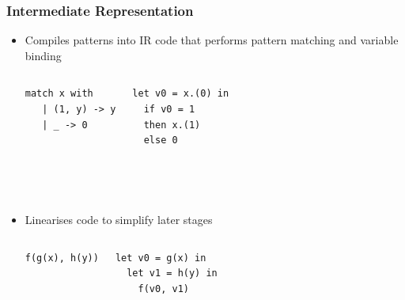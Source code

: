 \documentclass{beamer}
\begin{document}
\begin{frame}[fragile]  \frametitle{Intermediate Representation}
\begin{itemize}
\item Compiles patterns into IR code that performs pattern matching and variable binding

\begin{columns}[c] %
\begin{verbatim}
match x with
   | (1, y) -> y
   | _ -> 0

\end{verbatim}

\begin{verbatim}
let v0 = x.(0) in
  if v0 = 1
  then x.(1)
  else 0
\end{verbatim}
\end{columns} %
\text{} \\
\text{} \\

\item Linearises code to simplify later stages %

\begin{columns}[c] 
\begin{verbatim}
f(g(x), h(y))


\end{verbatim}
\begin{verbatim}
let v0 = g(x) in
  let v1 = h(y) in 
    f(v0, v1)
\end{verbatim}
\end{columns}
\end{itemize}
\end{frame}

\end{document}
